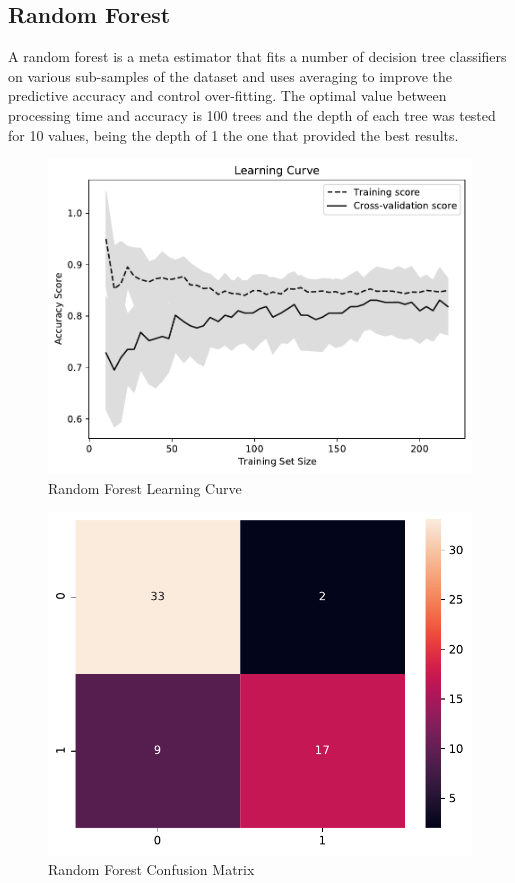 \documentclass[conference]{IEEEtran}
\begin{document}
\subsection{Random Forest}

A random forest is a meta estimator that fits a number of decision tree classifiers on various sub-samples of the dataset and uses averaging to improve the predictive accuracy and control over-fitting. The optimal value between processing time and accuracy is 100 trees and the depth of each tree was tested for 10 values, being the depth of 1 the one that provided the best results.

\begin{figure}[H]
    \centerline{\includegraphics[width=0.9\linewidth]{images/RandomForestClassifier_lc.pdf}}
    \caption{Random Forest Learning Curve}
    \label{rf_lc}
\end{figure}

\noindent


\begin{figure}[H]
    \centerline{\includegraphics[width=0.8\linewidth]{images/random_forest_cm.pdf}}
    \caption{Random Forest Confusion Matrix}
    \label{rf_cm}
\end{figure}
\end{document}
